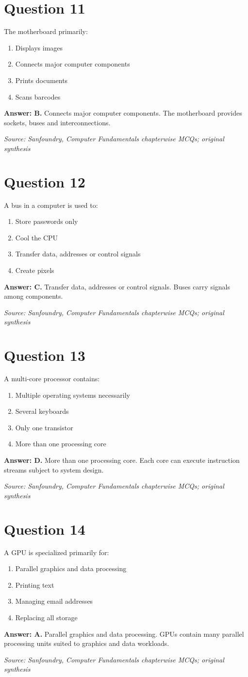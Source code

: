 \documentclass[11pt,a4paper]{book}
\newcommand{\source}[1]{\par\smallskip\textit{Source: #1}}
\newcommand{\answer}[2]{\par\textbf{Answer: #1.} #2}
\begin{document}
\section*{Question 11}
The motherboard primarily:
\begin{enumerate}[label=\Alph*.]
\item Displays images
\item Connects major computer components
\item Prints documents
\item Scans barcodes
\end{enumerate}
\answer{B}{Connects major computer components. The motherboard provides sockets, buses and interconnections.}
\source{Sanfoundry, Computer Fundamentals chapterwise MCQs; original synthesis}
\section*{Question 12}
A bus in a computer is used to:
\begin{enumerate}[label=\Alph*.]
\item Store passwords only
\item Cool the CPU
\item Transfer data, addresses or control signals
\item Create pixels
\end{enumerate}
\answer{C}{Transfer data, addresses or control signals. Buses carry signals among components.}
\source{Sanfoundry, Computer Fundamentals chapterwise MCQs; original synthesis}
\section*{Question 13}
A multi-core processor contains:
\begin{enumerate}[label=\Alph*.]
\item Multiple operating systems necessarily
\item Several keyboards
\item Only one transistor
\item More than one processing core
\end{enumerate}
\answer{D}{More than one processing core. Each core can execute instruction streams subject to system design.}
\source{Sanfoundry, Computer Fundamentals chapterwise MCQs; original synthesis}
\section*{Question 14}
A GPU is specialized primarily for:
\begin{enumerate}[label=\Alph*.]
\item Parallel graphics and data processing
\item Printing text
\item Managing email addresses
\item Replacing all storage
\end{enumerate}
\answer{A}{Parallel graphics and data processing. GPUs contain many parallel processing units suited to graphics and data workloads.}
\source{Sanfoundry, Computer Fundamentals chapterwise MCQs; original synthesis}
\end{document}
